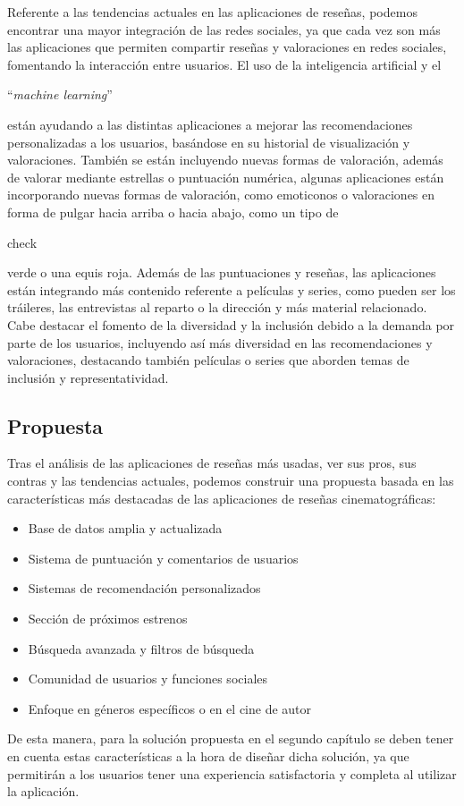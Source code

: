 Referente a las tendencias actuales en las aplicaciones de reseñas, podemos encontrar una mayor 
integración de las redes sociales, ya que cada vez son más las aplicaciones que permiten compartir 
reseñas y valoraciones en redes sociales, fomentando la interacción entre usuarios. El uso de la 
inteligencia artificial y el \begin{otherlanguage}{english}``\textit{machine 
learning}''\end{otherlanguage} \cite{MachLear} están ayudando a las distintas aplicaciones a mejorar 
las recomendaciones personalizadas a los usuarios, basándose en su historial de visualización y 
valoraciones. También se están incluyendo nuevas formas de valoración, además de valorar mediante 
estrellas o puntuación numérica, algunas aplicaciones están incorporando nuevas formas de valoración, 
como emoticonos o valoraciones en forma de pulgar hacia arriba o hacia abajo, como un tipo de 
\begin{otherlanguage}{english}check \end{otherlanguage} verde o una equis roja. Además de las 
puntuaciones y reseñas, las aplicaciones están integrando más contenido referente a películas y series, 
como pueden ser los tráileres, las entrevistas al reparto o la dirección y más material relacionado. 
Cabe destacar el fomento de la diversidad y la inclusión debido a la demanda por parte de los usuarios, 
incluyendo así más diversidad en las recomendaciones y valoraciones, destacando también películas o 
series que aborden temas de inclusión y representatividad.

\subsection{Propuesta}

Tras el análisis de las aplicaciones de reseñas más usadas, ver sus pros, sus contras y las tendencias 
actuales, podemos construir una propuesta basada en las características más destacadas de las 
aplicaciones de reseñas cinematográficas:

\begin{itemize}
\item Base de datos amplia y actualizada
\item Sistema de puntuación y comentarios de usuarios
\item Sistemas de recomendación personalizados
\item Sección de próximos estrenos
\item Búsqueda avanzada y filtros de búsqueda
\item Comunidad de usuarios y funciones sociales
\item Enfoque en géneros específicos o en el cine de autor
\end{itemize}

De esta manera, para la solución propuesta en el segundo capítulo se deben tener en cuenta estas 
características a la hora de diseñar dicha solución, ya que permitirán a los usuarios tener una 
experiencia satisfactoria y completa al utilizar la aplicación.
